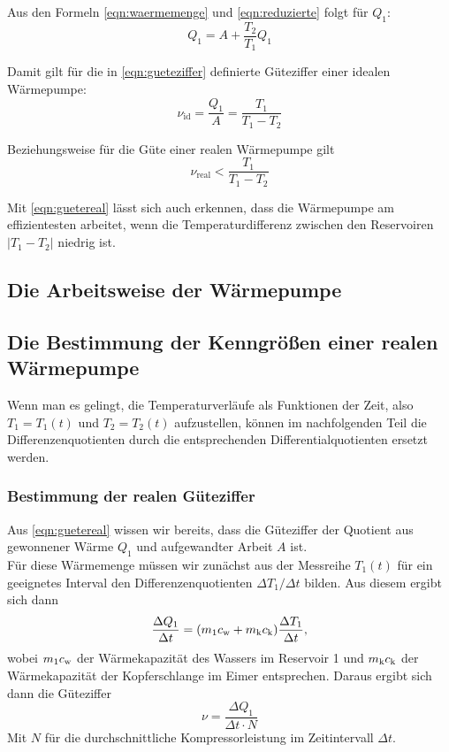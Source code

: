 Aus den Formeln \ref{eqn:waermemenge} und \ref{eqn:reduzierte} folgt für $Q_1$:
\begin{equation}
	Q_1 = A + \frac{T_2}{T_1} Q_1
	\label{eqn:q1}
\end{equation}

Damit gilt für die in \ref{eqn:gueteziffer} definierte Güteziffer einer idealen Wärmepumpe:
\begin{equation}
	\nu_\text{id} = \frac{Q_1}{A} = \frac{T_1}{T_1 - T_2}
	\label{eqn:gueteideal}
\end{equation}

Beziehungsweise für die Güte einer realen Wärmepumpe gilt
\begin{equation}
	\nu_\text{real} <
	\frac{T_1}{T_1 - T_2}
	\label{eqn:guetereal}
\end{equation}

Mit \ref{eqn:guetereal} lässt sich auch erkennen, dass die Wärmepumpe am effizientesten arbeitet,
wenn die Temperaturdifferenz zwischen den Reservoiren $\vert T_1 - T_2 \vert$ niedrig ist.

\subsection{Die Arbeitsweise der Wärmepumpe}

\subsection{Die Bestimmung der Kenngrößen einer realen
Wärmepumpe}

Wenn man es gelingt, die Temperaturverl\"aufe als Funktionen der Zeit, also $T_1 = T_1(t)$ und
$T_2 = T_2(t)$ aufzustellen, k\"onnen im nachfolgenden Teil die Differenzenquotienten durch
die entsprechenden Differentialquotienten ersetzt werden.

\subsubsection{Bestimmung der realen Güteziffer}

Aus \ref{eqn:guetereal} wissen wir bereits, dass die Güteziffer der Quotient aus gewonnener Wärme 
$Q_1$ und aufgewandter Arbeit $A$ ist. \\
Für diese Wärmemenge müssen wir zunächst aus der Messreihe $T_1(t)$ für ein geeignetes Interval 
den Differenzenquotienten $\Delta T_1 / \Delta t$ bilden. Aus diesem ergibt sich dann
\begin{equation}
	\frac{\Delta Q_1}{\Delta t}
	= (m_1 c_\text w + m_\text k c_\text k) \frac{\Delta T_1}{\Delta t},
	\label{eqn:bestgueteziffer1}
\end{equation}
wobei $m_1c_\text w$ der Wärmekapazität des Wassers im Reservoir 1 und $m_\text k c_\text k$ der
Wärmekapazität der Kopferschlange im Eimer entsprechen. Daraus ergibt sich dann die 
Güteziffer
\begin{equation}
	\nu = \frac{\Delta Q_1}{\Delta t \cdot N}
	\label{eqn:gueteziffer}
\end{equation}
Mit $N$ für die durchschnittliche Kompressorleistung im Zeitintervall $\Delta t$.

